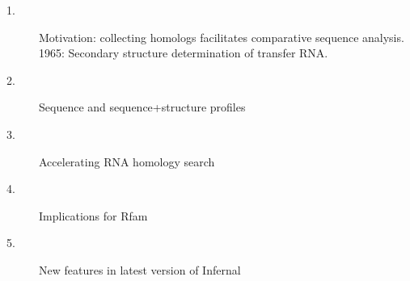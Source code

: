 \documentclass[landscape]{slides}
\begin{document}
\begin{slide}
\begin{slide}
\begin{center}
\small
\begin{description}
\item[1.] Motivation: collecting homologs facilitates comparative
  sequence analysis.\\ 1965: Secondary structure determination of
  transfer RNA.
\item[2.] Sequence and sequence+structure profiles
\item[3.] Accelerating RNA homology search
\item[4.] Implications for Rfam
\item[5.] New features in latest version of Infernal
\end{description}

\end{center}
\vfill
\end{slide}
\begin{slide}
\end{slide}
\begin{slide}

\end{slide}
\end{slide}
\end{document}
